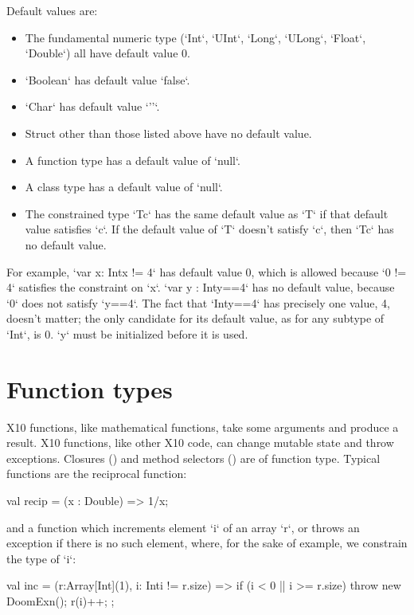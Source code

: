 Default values are: 
\begin{itemize}
\item The fundamental numeric type (\xcd`Int`, \xcd`UInt`,
      \xcd`Long`, \xcd`ULong`, 
      \xcd`Float`, \xcd`Double`) all have default value 0.
\item \xcd`Boolean` has default value \xcd`false`.
\item \xcd`Char` has default value \xcd`'\0'`.
\item Struct other than those listed above have no default value.
\item A function type has a default value of \xcd`null`.
\item A class type has a default value of \xcd`null`.
\item The constrained type \xcd`T{c}` has the same default value as \xcd`T` if
      that default value satisfies \xcd`c`.  If the default value of \xcd`T`
      doesn't satisfy \xcd`c`, then \xcd`T{c}` has no default value.
\end{itemize}

For example, \xcd`var x: Int{x != 4}` has default value 0, which is allowed
because \xcd`0 != 4` satisfies the constraint on \xcd`x`. 
\xcd`var y : Int{y==4}` has no default value, because \xcd`0` does not satisfy \xcd`y==4`.
The fact that \xcd`Int{y==4}` has precisely one value, \viz{} 4, doesn't
matter; the only candidate for its default value, as for any subtype of
\xcd`Int`, is 0. \xcd`y` must be initialized before it is used.

\section{Function types}
\label{FunctionTypes}
\label{FunctionType}

X10 functions, like mathematical functions, take some arguments and produce a
result.  X10 functions, like other X10 code, can change mutable state and
throw exceptions.  Closures () and method
selectors () are of function type.
Typical functions are the reciprocal function: 
\begin{xten}
val recip = (x : Double) => 1/x;
\end{xten}
and a function which increments  element \xcd`i` of an array \xcd`r`, or throws an exception
if there is no such element, where, for the sake of example, we constrain the
type of \xcd`i`:  
\begin{xten}
val inc = (r:Array[Int](1), i: Int{i != r.size}) => {
  if (i < 0 || i >= r.size) throw new DoomExn();
  r(i)++;
};
\end{xten}


